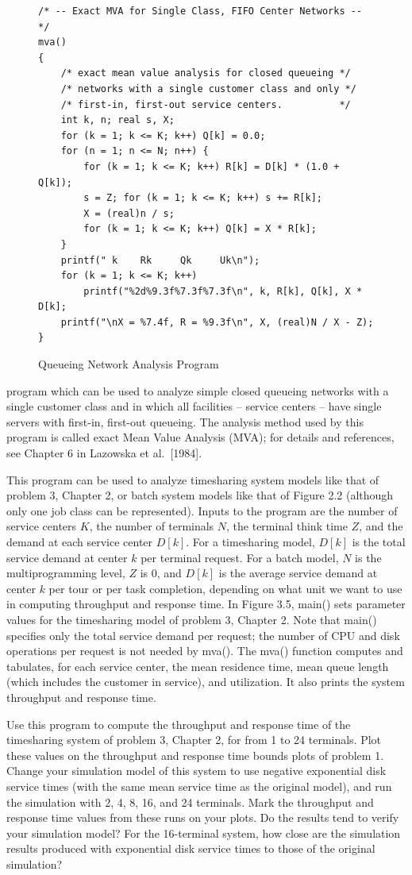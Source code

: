 \begin{enumerate}
\begin{figure}[H]
\begin{verbatim}
/* -- Exact MVA for Single Class, FIFO Center Networks -- */
mva()
{
    /* exact mean value analysis for closed queueing */
    /* networks with a single customer class and only */
    /* first-in, first-out service centers.          */
    int k, n; real s, X;
    for (k = 1; k <= K; k++) Q[k] = 0.0;
    for (n = 1; n <= N; n++) {
        for (k = 1; k <= K; k++) R[k] = D[k] * (1.0 + Q[k]);
        s = Z; for (k = 1; k <= K; k++) s += R[k];
        X = (real)n / s;
        for (k = 1; k <= K; k++) Q[k] = X * R[k];
    }
    printf(" k    Rk     Qk     Uk\n");
    for (k = 1; k <= K; k++)
        printf("%2d%9.3f%7.3f%7.3f\n", k, R[k], Q[k], X * D[k];
    printf("\nX = %7.4f, R = %9.3f\n", X, (real)N / X - Z);
}
\end{verbatim}
\endgroup
\caption{Queueing Network Analysis Program}
\end{figure}
\noindent program which can be used to analyze simple closed queueing networks with a single
customer class and in which all facilities -- service centers -- have single
servers with first-in, first-out queueing. The analysis method used by this
program is called exact Mean Value Analysis (MVA); for details and references,
see Chapter 6 in Lazowska et al.\ [1984].

This program can be used to analyze timesharing system models like that of
problem 3, Chapter 2, or batch system models like that of Figure 2.2 (although
only one job class can be represented). Inputs to the program are the number
of service centers $K$, the number of terminals $N$, the terminal think time
$Z$, and the demand at each service center $D[k]$. For a timesharing model,
$D[k]$ is the total service demand at center $k$ per terminal request. For a
batch model, $N$ is the multiprogramming level, $Z$ is 0, and $D[k]$ is the
average service demand at center $k$ per tour or per task completion,
depending on what unit we want to use in computing throughput and response
time. In Figure 3.5, main() sets parameter values for the timesharing model of
problem 3, Chapter 2. Note that main() specifies only the total service demand
per request; the number of CPU and disk operations per request is not needed
by mva(). The mva() function computes and tabulates, for each service center,
the mean residence time, mean queue length (which includes the customer in
service), and utilization. It also prints the system throughput and response
time.

Use this program to compute the throughput and response time of the
 timesharing system of problem 3, Chapter 2, for from 1 to 24 terminals. Plot
these values on the throughput and response time bounds plots of problem 1.
Change your simulation model of this system to use negative exponential disk
service times (with the same mean service time as the original model), and run
 the simulation with 2, 4, 8, 16, and 24 terminals. Mark the throughput and
response time values from these runs on your plots. Do the results tend to
verify your simulation model? For the 16-terminal system, how close are the
simulation results produced with exponential disk service times to those of
the original simulation?


\end{enumerate}
